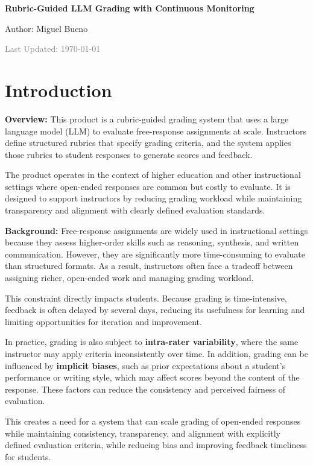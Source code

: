 \documentclass[11pt]{article}
\newcommand{\prdtitle}[1]{\begin{center}\LARGE\bfseries #1\end{center}}
\newcommand{\prdauthor}[1]{\begin{center}\normalsize #1\end{center}}
\newcommand{\prdmeta}[1]{\begin{center}\small\textcolor{gray}{#1}\end{center}}
\begin{document}
\prdtitle{Rubric-Guided LLM Grading with Continuous Monitoring}
\prdauthor{Author: Miguel Bueno}
\prdmeta{Last Updated: \today}

\vspace{1em}

\section{Introduction}
\textbf{Overview:} This product is a rubric-guided grading system that uses a
large language model (LLM) to evaluate free-response assignments at scale.
Instructors define structured rubrics that specify grading criteria, and the
system applies those rubrics to student responses to generate scores and
feedback.

The product operates in the context of higher education and other instructional
settings where open-ended responses are common but costly to evaluate. It is
designed to support instructors by reducing grading workload while maintaining
transparency and alignment with clearly defined evaluation standards.

\textbf{Background:} 
Free-response assignments are widely used in instructional settings because they
assess higher-order skills such as reasoning, synthesis, and written communication.
However, they are significantly more time-consuming to evaluate than structured
formats. As a result, instructors often face a tradeoff between assigning richer,
open-ended work and managing grading workload.

This constraint directly impacts students. Because grading is time-intensive,
feedback is often delayed by several days, reducing its usefulness for learning and
limiting opportunities for iteration and improvement.

In practice, grading is also subject to \textbf{intra-rater variability}, where the
same instructor may apply criteria inconsistently over time. In addition, grading
can be influenced by \textbf{implicit biases}, such as prior expectations about a
student’s performance or writing style, which may affect scores beyond the content
of the response. These factors can reduce the consistency and perceived fairness of
evaluation.

This creates a need for a system that can scale grading of open-ended responses
while maintaining consistency, transparency, and alignment with explicitly defined
evaluation criteria, while reducing bias and improving feedback timeliness for students.
\end{document}
